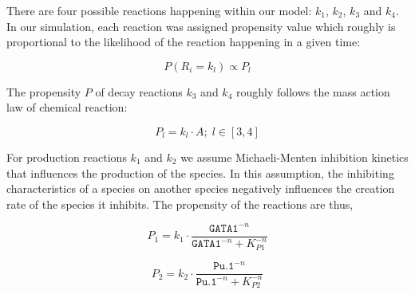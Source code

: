 \documentclass[12pt, oneside]{article}
\begin{document}
\begin{center}
\end{center}

There are four possible reactions happening within our model: $k_1$, $k_2$, $k_3$ and $k_4$. In our simulation, each reaction was assigned propensity value which roughly is proportional to the likelihood of the reaction happening in a given time:

$$P(R_i = k_l) \propto P_l$$

The propensity $P$ of decay reactions $k_3$ and $k_4$ roughly follows the mass action law of chemical reaction:

$$P_l = k_l \cdot A {;} \; l \in [3, 4]$$

For production reactions $k_1$ and $k_2$ we assume Michaeli-Menten inhibition kinetics that influences the production of the species. In this assumption, the inhibiting characteristics of a species on another species negatively influences the creation rate of the species it inhibits. The propensity of the reactions are thus,

$$P_1 = k_1 \cdot \frac{\texttt{GATA1}^{-n}}{\texttt{GATA1}^{-n} + K_{P1}^{-n}}$$

$$P_2 = k_2 \cdot \frac{\texttt{Pu.1}^{-n}}{\texttt{Pu.1}^{-n} + K_{P2}^{-n}}$$
\end{document}
